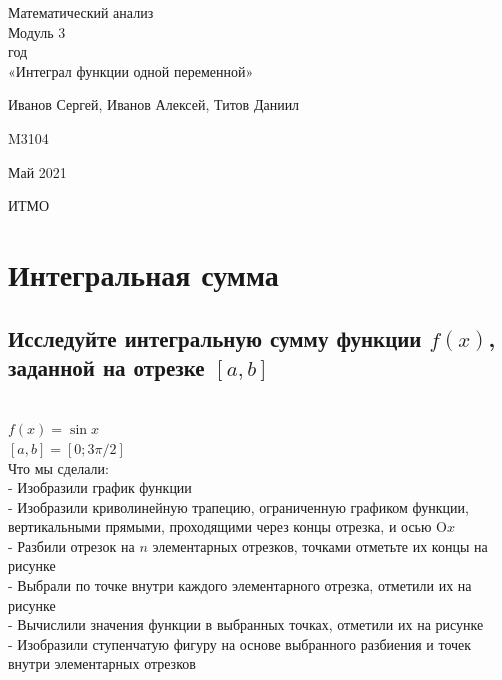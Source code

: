 \documentclass{article}
\begin{document}
\begin{center}
\hfill \break

\LARGE{Математический анализ}\\
\hfill \break
\normalsize{Модуль 3\\
\hfill {} год\\
\hfill \break
«Интеграл функции одной переменной»}\\
\hfill \break
\hfill \break
\hfill \break
\hfill \break
\end{center}

\begin{flushright} Иванов Сергей, Иванов Алексей, Титов Даниил \end{flushright}
\begin{flushright} M3104 \end{flushright}
\hfill \break
\hfill \break
\hfill \break
\hfill \break
\hfill \break
\hfill \break
\hfill \break
\hfill \break
\hfill \break
\hfill \break
\hfill \break
\hfill \break
\hfill \break
\hfill \break
\hfill \break
\hfill \break
\hfill \break
\hfill \break
\hfill \break
\hfill \break
\hfill \break
\hfill \break
\hfill \break
\begin{center} Май 2021 \end{center}
\begin{center} ИТМО \end{center}
\thispagestyle{empty} %
\newpage
\tableofcontents{}
\newpage
\section{Интегральная сумма}
\normalsize
\subsection{Исследуйте интегральную сумму функции $f(x)$, заданной на отрезке $[a, b]$}
\\
$ f(x) = \sin{x} $\\
$ [a, b] = [0; 3\pi/2] $\\

Что мы сделали:\\
- Изобразили график функции\\
- Изобразили криволинейную трапецию, ограниченную графиком функции, вертикальными прямыми, проходящими через концы отрезка, и осью O$x$\\
- Разбили отрезок на $n$ элементарных отрезков, точками отметьте их концы на рисунке\\
- Выбрали по точке внутри каждого элементарного отрезка, отметили их на рисунке\\
- Вычислили значения функции в выбранных точках, отметили их на рисунке\\
- Изобразили ступенчатую фигуру на основе выбранного разбиения и точек внутри элементарных отрезков\\
\end{document}
